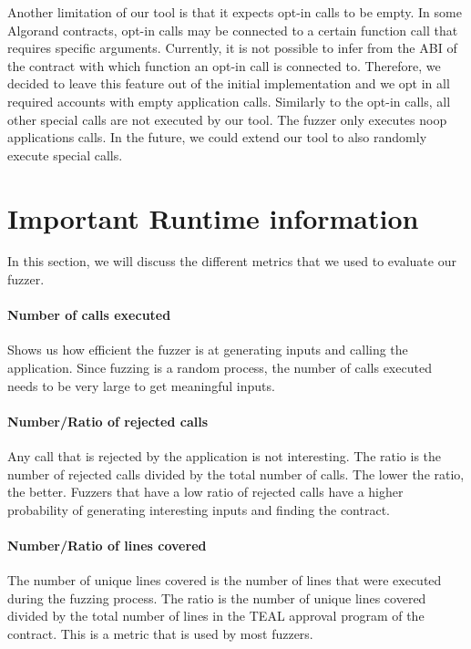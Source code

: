 Another limitation of our tool is that it expects opt-in calls to be empty.
In some Algorand contracts, opt-in calls may be connected to a certain function call that requires specific arguments.
Currently, it is not possible to infer from the \ac{ABI} of the contract with which function an opt-in call is connected to.
Therefore, we decided to leave this feature out of the initial implementation and we opt in all required accounts with empty application calls.
Similarly to the opt-in calls, all other special calls are not executed by our tool.
The fuzzer only executes noop applications calls.
In the future, we could extend our tool to also randomly execute special calls.

\section{Important Runtime information} \label{section:metrics}
In this section, we will discuss the different metrics that we used to evaluate our fuzzer.

\paragraph{Number of calls executed} Shows us how efficient the fuzzer is at generating inputs and calling the application.
Since fuzzing is a random process, the number of calls executed needs to be very large to get meaningful inputs.

\paragraph{Number/Ratio of rejected calls} Any call that is rejected by the application is not interesting.
The ratio is the number of rejected calls divided by the total number of calls.
The lower the ratio, the better.
Fuzzers that have a low ratio of rejected calls have a higher probability of generating interesting inputs and finding the contract.

\paragraph{Number/Ratio of lines covered} The number of unique lines covered is the number of lines that were executed during the fuzzing process.
The ratio is the number of unique lines covered divided by the total number of lines in the \ac{TEAL} approval program of the contract.
This is a metric that is used by most fuzzers.

